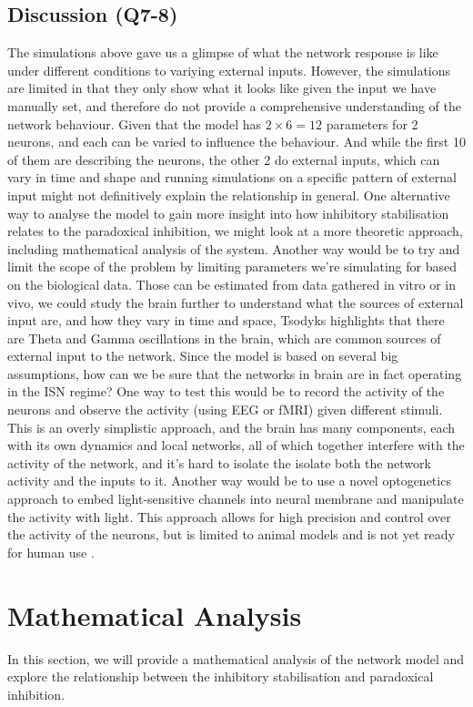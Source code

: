 \documentclass[10pt,twocolumn]{article}
\begin{document}
\subsection{Discussion (Q7-8)}
The simulations above gave us a glimpse of what the network response
is like under different conditions to variying external inputs.
However, the simulations are limited in that they only show what 
it looks like given the input we have manually set, and therefore
do not provide a comprehensive understanding of the network behaviour.
Given that the model has $2\times 6=12$ parameters for 2 neurons,
and each can be varied to influence the behaviour.
%  
And while the first 10 of them are describing the neurons, 
the other 2 do external inputs, which can vary in time and shape and 
running simulations on a specific pattern of external input might not 
definitively explain the relationship in general.
One alternative way to analyse the model to gain more insight 
into how inhibitory stabilisation relates to the paradoxical inhibition, 
we might look at a more theoretic approach, including 
mathematical analysis of the system. 
% 
Another way would be to try and limit the scope of the problem
by limiting parameters we're simulating for based on the biological data.
Those can be estimated from data gathered in vitro or in vivo, 
we could study the brain further to understand what the sources
of external input are, and how they vary in time and space,
Tsodyks highlights \cite{tsodyks1997paradoxical} that there are 
Theta and Gamma oscillations in the brain, which are common
sources of external input to the network.
% 
Since the model is based on several big assumptions, how can we be sure
that the networks in brain are in fact operating in the ISN regime?
One way to test this would be to record the activity of the neurons
and observe the activity (using EEG or fMRI) given different
stimuli. This is an overly simplistic approach, and the brain has
many components, each with its own dynamics and local networks,
all of which together interfere with the activity of the network,
and it's hard to isolate the isolate both the network activity
and the inputs to it.
Another way would be to use a novel optogenetics approach
to embed light-sensitive channels into neural membrane and 
manipulate the activity with light. This approach allows for high 
precision and control over the activity of the neurons, but 
is limited to animal models and is not yet ready for 
human use \cite{sadeh2021inhibitory}.
%  

\section{Mathematical Analysis}
In this section, we will provide a mathematical analysis
of the network model and explore the relationship between
the inhibitory stabilisation and paradoxical inhibition.
\end{document}
